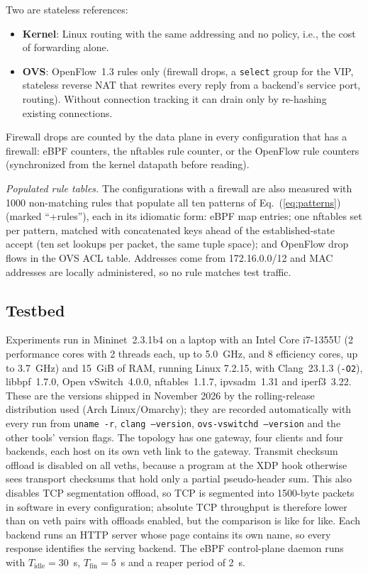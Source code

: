 \documentclass[conference]{IEEEtran}
\begin{document}
Two are stateless references:
\begin{itemize}
\item \textbf{Kernel}: Linux routing with the same addressing and no policy,
i.e., the cost of forwarding alone.
\item \textbf{OVS}: OpenFlow~1.3 rules only (firewall drops, a \texttt{select}
group for the VIP, stateless reverse NAT that rewrites every reply from a
backend's service port, routing). Without connection tracking it can drain
only by re-hashing existing connections.
\end{itemize}
Firewall drops are counted by the data plane in every configuration that has
a firewall: eBPF counters, the nftables rule counter, or the OpenFlow rule
counters (synchronized from the kernel datapath before reading).

\textit{Populated rule tables.} The configurations with a firewall are also
measured with 1000 non-matching rules that populate all ten patterns of
Eq.~(\ref{eq:patterns}) (marked ``+rules''), each in its idiomatic form: eBPF
map entries; one nftables set per pattern, matched with concatenated keys
ahead of the established-state accept (ten set lookups per packet, the same
tuple space); and OpenFlow drop flows in the OVS ACL table. Addresses come
from 172.16.0.0/12 and MAC addresses are locally administered, so no rule
matches test traffic.

\subsection{Testbed}
Experiments run in Mininet~2.3.1b4 \cite{lantz2010mininet} on a laptop with an
Intel Core i7-1355U (2 performance cores with 2 threads each, up to 5.0~GHz,
and 8 efficiency cores, up to 3.7~GHz) and 15~GiB of RAM, running Linux
7.2.15, with Clang~23.1.3 (\texttt{-O2}), libbpf~1.7.0, Open vSwitch~4.0.0,
nftables~1.1.7, ipvsadm~1.31 and iperf3~3.22. These are the versions
shipped in November 2026 by the rolling-release distribution used (Arch
Linux/Omarchy); they are recorded automatically with every run from
\texttt{uname -r}, \texttt{clang --version}, \texttt{ovs-vswitchd --version}
and the other tools' version flags. The topology has one gateway, four clients and
four backends, each host on its own veth link to the gateway. Transmit
checksum offload is disabled on all veths, because a program at the XDP hook
otherwise sees transport checksums that hold only a partial pseudo-header
sum. This also disables TCP segmentation offload, so TCP is segmented into
1500-byte packets in software in every configuration; absolute TCP
throughput is therefore lower than on veth pairs with offloads enabled, but
the comparison is like for like. Each backend runs an HTTP server whose page
contains its own name, so every response identifies the serving backend. The
eBPF control-plane daemon runs with $T_{\mathrm{idle}}=30$~s, $T_{\mathrm{fin}}=5$~s and a
reaper period of 2~s.
\end{document}
